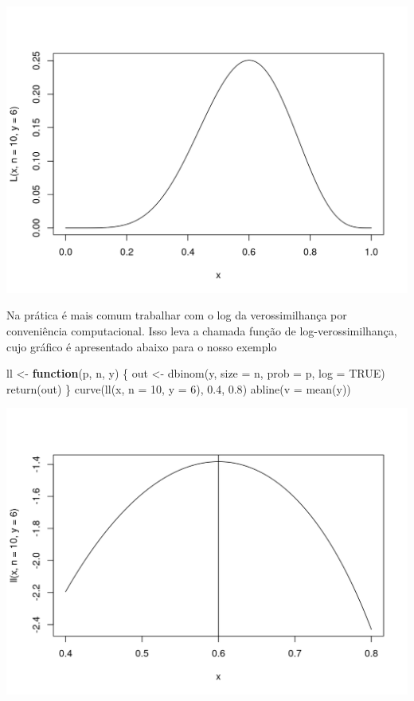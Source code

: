 \documentclass[
  10pt,
  a4paper]{book}
\newenvironment{Shaded}{\begin{snugshade}}{\end{snugshade}}
\newcommand{\AttributeTok}[1]{\textcolor[rgb]{0.77,0.63,0.00}{#1}}
\newcommand{\ConstantTok}[1]{\textcolor[rgb]{0.00,0.00,0.00}{#1}}
\newcommand{\ControlFlowTok}[1]{\textcolor[rgb]{0.13,0.29,0.53}{\textbf{#1}}}
\newcommand{\DecValTok}[1]{\textcolor[rgb]{0.00,0.00,0.81}{#1}}
\newcommand{\FloatTok}[1]{\textcolor[rgb]{0.00,0.00,0.81}{#1}}
\newcommand{\FunctionTok}[1]{\textcolor[rgb]{0.00,0.00,0.00}{#1}}
\newcommand{\NormalTok}[1]{#1}
\newcommand{\OtherTok}[1]{\textcolor[rgb]{0.56,0.35,0.01}{#1}}
\begin{document}
\begin{center}\includegraphics{figures/unnamed-chunk-374-1} \end{center}

Na prática é mais comum trabalhar com o log da verossimilhança por conveniência computacional. Isso leva a chamada função de log-verossimilhança, cujo gráfico é apresentado abaixo para o nosso exemplo

\begin{Shaded}
\begin{Highlighting}[]
\NormalTok{ll }\OtherTok{\textless{}{-}} \ControlFlowTok{function}\NormalTok{(p, n, y) \{}
\NormalTok{  out }\OtherTok{\textless{}{-}} \FunctionTok{dbinom}\NormalTok{(y, }\AttributeTok{size =}\NormalTok{ n, }\AttributeTok{prob =}\NormalTok{ p, }\AttributeTok{log =} \ConstantTok{TRUE}\NormalTok{)}
  \FunctionTok{return}\NormalTok{(out)}
\NormalTok{\}}
\FunctionTok{curve}\NormalTok{(}\FunctionTok{ll}\NormalTok{(x, }\AttributeTok{n =} \DecValTok{10}\NormalTok{, }\AttributeTok{y =} \DecValTok{6}\NormalTok{), }\FloatTok{0.4}\NormalTok{, }\FloatTok{0.8}\NormalTok{)}
\FunctionTok{abline}\NormalTok{(}\AttributeTok{v =} \FunctionTok{mean}\NormalTok{(y))}
\end{Highlighting}
\end{Shaded}

\begin{center}\includegraphics{figures/unnamed-chunk-375-1} \end{center}
\end{document}
